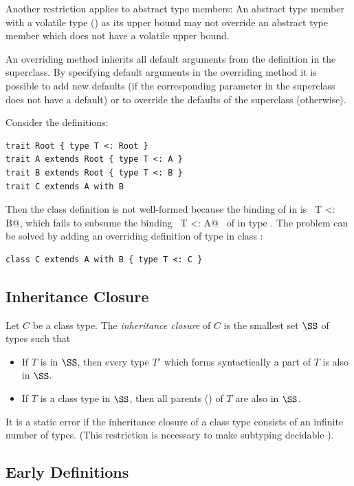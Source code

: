 Another restriction applies to abstract type members: An abstract type
member with a volatile type () as its upper
bound may not override an abstract type member which does not have a
volatile upper bound.

An overriding method inherits all default arguments from the definition
in the superclass. By specifying default arguments in the overriding method
it is possible to add new defaults (if the corresponding parameter in the
superclass does not have a default) or to override the defaults of the
superclass (otherwise).

\example\label{ex:compound-a}
Consider the definitions:
\begin{lstlisting}
trait Root { type T <: Root }
trait A extends Root { type T <: A }
trait B extends Root { type T <: B }
trait C extends A with B 
\end{lstlisting}
Then the class definition  is not well-formed because the
binding of  in  is
~\lstinline@type T <: B@,
which fails to subsume the binding ~\lstinline@type T <: A@~ of 
in type . The problem can be solved by adding an overriding 
definition of type  in class :
\begin{lstlisting}
class C extends A with B { type T <: C }
\end{lstlisting}

\subsection{Inheritance Closure}\label{sec:inheritance-closure}

Let $C$ be a class type. The {\em inheritance closure} of $C$ is the
smallest set $\SS$ of types such that
\begin{itemize}
\item
If $T$ is in $\SS$, then every type $T'$ which forms syntactically
a part of $T$ is also in $\SS$.
\item
If $T$ is a class type in $\SS$, then all parents ()
of $T$ are also in $\SS$.
\end{itemize}
It is a static error if the inheritance closure of a class type
consists of an infinite number of types. (This restriction is
necessary to make subtyping decidable
\cite{kennedy-pierce:decidable}).

\subsection{Early Definitions}\label{sec:early-defs}

